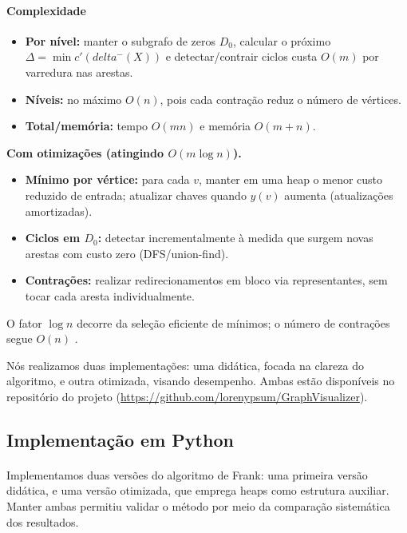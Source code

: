 \documentclass[12pt,a4paper]{article}
\def\emph#1{#1}%
\def\delta{delta}%
\begin{document}
\paragraph{Complexidade}

\begin{itemize}\setlength{\itemsep}{2pt}
    \item \textbf{Por nível:} manter o subgrafo de zeros \(D_0\), calcular o próximo \(\Delta=\min c'(\delta^-(X))\) e detectar/contrair ciclos custa \(O(m)\) por varredura nas arestas.
    \item \textbf{Níveis:} no máximo \(O(n)\), pois cada contração reduz o número de vértices.
    \item \textbf{Total/memória:} tempo \(O(mn)\) e memória \(O(m+n)\).
\end{itemize}

	\textbf{Com otimizações (atingindo \(O(m\log n)\)).}
\begin{itemize}\setlength{\itemsep}{2pt}
    \item \textbf{Mínimo por vértice:} para cada \(v\), manter em uma \emph{heap} o menor custo reduzido de entrada; atualizar chaves quando \(y(v)\) aumenta (atualizações amortizadas).
    \item \textbf{Ciclos em \(D_0\):} detectar incrementalmente à medida que surgem novas arestas com custo zero (DFS/union-find).
    \item \textbf{Contrações:} realizar redirecionamentos em bloco via representantes, sem tocar cada aresta individualmente.
\end{itemize}
O fator \(\log n\) decorre da seleção eficiente de mínimos; o número de contrações segue \(O(n)\) \cite{frank2014,schrijver2003comb}.

Nós realizamos duas implementações: uma didática, focada na clareza do algoritmo, e outra otimizada, visando desempenho. Ambas estão disponíveis no repositório do projeto (\url{https://github.com/lorenypsum/GraphVisualizer}).

\subsection{Implementação em Python}

\paragraph{}
Implementamos duas versões do algoritmo de Frank: uma primeira versão didática, e uma versão otimizada, que emprega heaps como estrutura auxiliar. Manter ambas permitiu validar o método por meio da comparação sistemática dos resultados.
\end{document}
